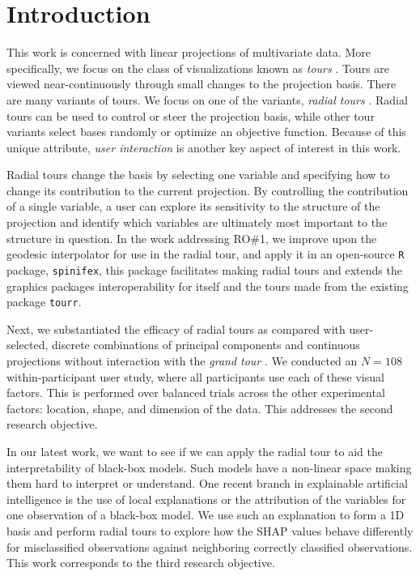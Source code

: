 \documentclass{template/monashthesis}
\begin{document}
\hypertarget{sec:intro}{%
\section{Introduction}\label{sec:intro}}

This work is concerned with linear projections of multivariate data. More specifically, we focus on the class of visualizations known as \emph{tours} \autocite{cook_grand_2008,lee_review_2021}. Tours are viewed near-continuously through small changes to the projection basis. There are many variants of tours. We focus on one of the variants, \emph{radial tours} \autocite{cook_manual_1997,spyrison_spinifex_2020}. Radial tours can be used to control or steer the projection basis, while other tour variants select bases randomly or optimize an objective function. Because of this unique attribute, \emph{user interaction} is another key aspect of interest in this work.

Radial tours change the basis by selecting one variable and specifying how to change its contribution to the current projection. By controlling the contribution of a single variable, a user can explore its sensitivity to the structure of the projection and identify which variables are ultimately most important to the structure in question. In the work addressing RO\#1, we improve upon the geodesic interpolator for use in the radial tour, and apply it in an open-source \texttt{R} package, \texttt{spinifex}, this package facilitates making radial tours and extends the graphics packages interoperability for itself and the tours made from the existing package \texttt{tourr}.

Next, we substantiated the efficacy of radial tours as compared with user-selected, discrete combinations of principal components \autocite{pearson_liii._1901} and continuous projections without interaction with the \emph{grand tour} \autocite{asimov_grand_1985}. We conducted an \(N=108\) within-participant user study, where all participants use each of these visual factors. This is performed over balanced trials across the other experimental factors: location, shape, and dimension of the data. This addresses the second research objective.

In our latest work, we want to see if we can apply the radial tour to aid the interpretability of black-box models. Such models have a non-linear space making them hard to interpret or understand. One recent branch in explainable artificial intelligence \autocite[XAI,][\textcite{arrieta_explainable_2020}]{adadi_peeking_2018} is the use of local explanations or the attribution of the variables for one observation of a black-box model. We use such an explanation to form a 1D basis and perform radial tours to explore how the SHAP values behave differently for misclassified observations against neighboring correctly classified observations. This work corresponds to the third research objective.
\end{document}
